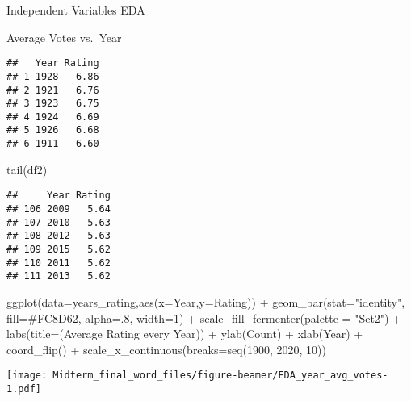\documentclass[
  ignorenonframetext,
]{beamer}
\newenvironment{Shaded}{\begin{snugshade}}{\end{snugshade}}
\newcommand{\AttributeTok}[1]{\textcolor[rgb]{0.77,0.63,0.00}{#1}}
\newcommand{\DecValTok}[1]{\textcolor[rgb]{0.00,0.00,0.81}{#1}}
\newcommand{\FunctionTok}[1]{\textcolor[rgb]{0.00,0.00,0.00}{#1}}
\newcommand{\NormalTok}[1]{#1}
\newcommand{\SpecialCharTok}[1]{\textcolor[rgb]{0.00,0.00,0.00}{#1}}
\newcommand{\StringTok}[1]{\textcolor[rgb]{0.31,0.60,0.02}{#1}}
\begin{document}
\begin{frame}[fragile]{Independent Variables EDA}
\begin{block}{Average Votes vs.~Year}
\begin{verbatim}
##   Year Rating
## 1 1928   6.86
## 2 1921   6.76
## 3 1923   6.75
## 4 1924   6.69
## 5 1926   6.68
## 6 1911   6.60
\end{verbatim}

\begin{Shaded}
\begin{Highlighting}[]
\FunctionTok{tail}\NormalTok{(df2)}
\end{Highlighting}
\end{Shaded}

\begin{verbatim}
##     Year Rating
## 106 2009   5.64
## 107 2010   5.63
## 108 2012   5.63
## 109 2015   5.62
## 110 2011   5.62
## 111 2013   5.62
\end{verbatim}

\begin{Shaded}
\begin{Highlighting}[]
\FunctionTok{ggplot}\NormalTok{(}\AttributeTok{data=}\NormalTok{years\_rating,}\FunctionTok{aes}\NormalTok{(}\AttributeTok{x=}\NormalTok{Year,}\AttributeTok{y=}\NormalTok{Rating)) }\SpecialCharTok{+}
  \FunctionTok{geom\_bar}\NormalTok{(}\AttributeTok{stat=}\StringTok{"identity"}\NormalTok{, }\AttributeTok{fill=}\StringTok{\textquotesingle{}\#FC8D62\textquotesingle{}}\NormalTok{, }\AttributeTok{alpha=}\NormalTok{.}\DecValTok{8}\NormalTok{, }\AttributeTok{width=}\DecValTok{1}\NormalTok{) }\SpecialCharTok{+}
    \FunctionTok{scale\_fill\_fermenter}\NormalTok{(}\AttributeTok{palette =} \StringTok{"Set2"}\NormalTok{) }\SpecialCharTok{+} 
      \FunctionTok{labs}\NormalTok{(}\AttributeTok{title=}\NormalTok{(}\StringTok{\textquotesingle{}Average Rating every Year\textquotesingle{}}\NormalTok{)) }\SpecialCharTok{+} 
        \FunctionTok{ylab}\NormalTok{(}\StringTok{\textquotesingle{}Count\textquotesingle{}}\NormalTok{) }\SpecialCharTok{+}
          \FunctionTok{xlab}\NormalTok{(}\StringTok{\textquotesingle{}Year\textquotesingle{}}\NormalTok{) }\SpecialCharTok{+}
            \FunctionTok{coord\_flip}\NormalTok{() }\SpecialCharTok{+}
              \FunctionTok{scale\_x\_continuous}\NormalTok{(}\AttributeTok{breaks=}\FunctionTok{seq}\NormalTok{(}\DecValTok{1900}\NormalTok{, }\DecValTok{2020}\NormalTok{, }\DecValTok{10}\NormalTok{))}
\end{Highlighting}
\end{Shaded}

\texttt{[image: Midterm\_final\_word\_files/figure-beamer/EDA\_year\_avg\_votes-1.pdf]}
\end{block}


\end{frame}
\end{document}
